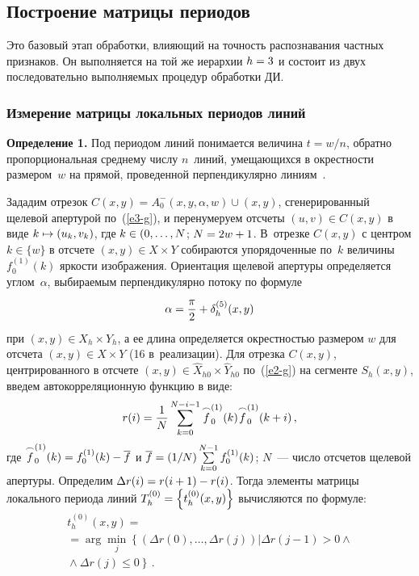 \begin{multicols}{2}
\addtocounter{figure}{1}


  

\subsection{Построение матрицы периодов} %

  Это базовый этап обработки, влияющий на точность распознавания частных 
признаков. Он выполняется на той же иерархии $h\hm=3$ и состоит из двух 
последовательно выполняемых процедур обработки ДИ.
  
  \subsubsection*{Измерение матрицы локальных периодов линий}
  
  \noindent
  \textbf{Определение 1.} Под периодом линий понимается величина $t=w/n$, 
обратно пропорциональная среднему числу $n$~линий, умещающихся в 
окрестности размером~$w$ на прямой, проведенной перпендикулярно 
линиям~\cite{1-g}.
  
  Зададим отрезок $C(x,y)=A_0^- (x,y,\alpha,w)\cup(x,y)$, сгенерированный 
щелевой апертурой по~(\ref{e3-g}), и перенумеруем отсчеты $(u,v)\in C(x,y)$ в 
виде $k\hm\mapsto (u_k,v_k)$, где $k\hm\in(0,\ldots  , N$; $N\hm=2w\hm+1$. В~отрезке 
$C(x,y)$ с центром $k\in \{w\}$ в отсчете $(x,y)\in X\times Y$ собираются 
упорядоченные по~$k$ величины $f_0^{(1)}(k)$ яркости изображения. 
Ориентация щелевой апертуры определяется углом~$\alpha$, выбираемым 
перпендикулярно потоку по формуле
  $$
  \alpha =\displaystyle\frac{\displaystyle \pi\mathstrut}{\displaystyle 2\mathstrut}+\delta_h^{(5)}(x,y)
  $$
при $(x,y)\in X_h\times Y_h$, а ее длина определяется окрестностью размером 
$w$ для отсчета $(x,y)\in X\times Y$ (16 в~реализации). Для отрезка $C(x,y)$, 
центрированного в отсчете $(x,y)\in \hat{X}_{h0}\times \hat{Y}_{h0}$ 
по~(\ref{e2-g}) на сегменте $S_h(x,y)$, введем автокорреляционную функцию в 
виде:
\begin{equation}
r(i) =\displaystyle\frac{\displaystyle 1\mathstrut}{\displaystyle N\mathstrut}\sum\limits_{k=0}^{N-i-1} \overset{\frown}{f}_0^{(1)}(k) 
\overset{\frown}{f}_0^{(1)}(k+i)\,,
\label{e13-g}
\end{equation}
где $\overset{\frown}{f}_0^{(1)}(k)\hm= f_0^{(1)}(k)-\overline{f}$ и 
$\overline{f} \hm= (1/N) \sum\limits_{k=0}^{N-1} f_0^{(1)}(k)$;  $N$~--- чис\-ло 
отсчетов щелевой апертуры. Определим $\Delta r(i) \hm= r(i+1)\hm-
r(i)$. Тогда элементы матрицы локального периода линий $T_h^{(0)}\hm=\left\{ 
t_h^{(0)}(x,y)\right\}$ вычисляются по формуле:
\begin{multline}
t_h^{(0)} (x,y)={}\\
{}=\arg \min\limits_j \left\{ \left( \Delta r(0),\ldots , \Delta r(j)\right) 
\vert \Delta r(j-1)>0 \wedge{}\right.\\
\left.{}\wedge \Delta r(j)\leq 0\right\}\,.
\label{e14-g}
\end{multline}
  

\end{multicols}
